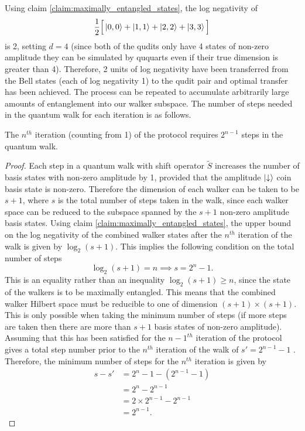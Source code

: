 Using claim \ref{claim:maximally_entangled_states}, the log negativity of
\begin{equation}
    \frac{1}{2}\Big[\ket{0,0} + \ket{1,1} + \ket{2,2} + \ket{3,3}\Big ]
\end{equation}
is 2, setting $d=4$ (since both of the qudits only have 4 states of non-zero amplitude they can be simulated by ququarts even if their true dimension is greater than 4).
Therefore, 2 units of log negativity have been transferred from the Bell states (each of log negativity 1) to the qudit pair and optimal transfer has been achieved.
The process can be repeated to accumulate arbitrarily large amounts of entanglement into our walker subspace.
The number of steps needed in the quantum walk for each iteration is as follows.
\begin{claim}
\label{claim:min_steps}
The $n^{th}$ iteration (counting from 1) of the protocol requires $2^{n-1}$ steps in the quantum walk.
\end{claim}
\begin{proof}
Each step in a quantum walk with shift operator $\tilde{S}$ increases the number of basis states with non-zero amplitude by 1, provided that the amplitude $\ket{\downarrow}$ coin basis state is non-zero.
Therefore the dimension of each walker can be taken to be $s + 1$, where $s$ is the total number of steps taken in the walk, since each walker space can be reduced to the subspace spanned by the $s+1$ non-zero amplitude basis states.
Using claim \ref{claim:maximally_entangled_states}, the upper bound on the log negativity of the combined walker states after the $n^{th}$ iteration of the walk is given by $\log_2(s+1)$.
This implies the following condition on the total number of steps
\begin{equation}
    \log_2(s+1) = n \implies s = 2^n -1.
\end{equation}
This is an equality rather than an inequality $\log_2(s+1) \geq n$, since the state of the walkers is to be maximally entangled.
This means that the combined walker Hilbert space must be reducible to one of dimension $(s+1) \times (s+1)$.
This is only possible when taking the minimum number of steps (if more steps are taken then there are more than $s+1$ basis states of non-zero amplitude).
Assuming that this has been satisfied for the $n-1^{th}$ iteration of the protocol gives a total step number prior to the $n^{th}$ iteration of the walk of $s' = 2^{n-1} -1$ .
Therefore, the minimum number of steps for the $n^{th}$ iteration is given by
\begin{align}
    s - s' &= 2^{n} - 1 - (2^{n-1} -1)\\
    &= 2^n - 2^{n-1}\\
    &= 2 \times 2^{n-1} - 2^{n-1}\\
    &= 2^{n-1}.
\end{align}
\end{proof}

